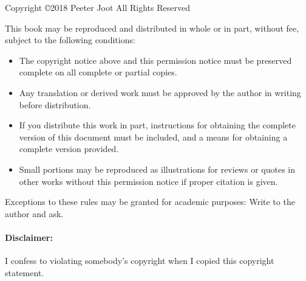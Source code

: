 


Copyright \copyright 2018 Peeter Joot
All Rights Reserved

This book may be reproduced and distributed in whole or in part, without fee, subject to the following conditions:

\begin{itemize}\item The copyright notice above and this permission notice must be preserved complete on all complete or partial copies.

\item Any translation or derived work must be approved by the author in writing before distribution.

\item If you distribute this work in part, instructions for obtaining the complete version of this document must be included, and a means for obtaining a complete version provided.

\item Small portions may be reproduced as illustrations for reviews or quotes in other works without this permission notice if proper citation is given.
\end{itemize}

Exceptions to these rules may be granted for academic purposes: Write to the author and ask.

\paragraph{Disclaimer:} I confess to violating somebody's copyright when I copied this copyright statement.

